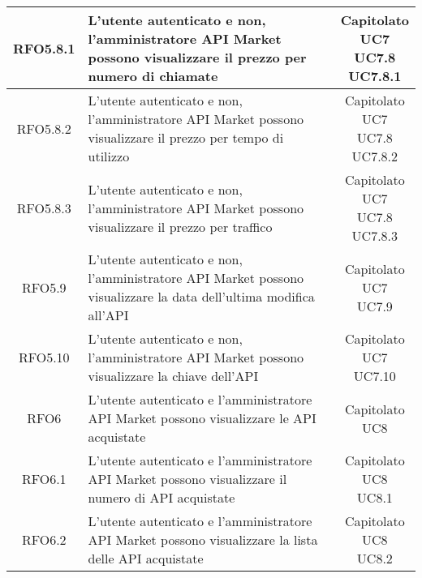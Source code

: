 \begin{longtable}{|c|p{8cm}|c|}
\hypertarget{RFO5.8.1}{RFO5.8.1} &  L'utente autenticato e non, l'amministratore API Market possono visualizzare il prezzo per numero di chiamate & \makecell*{Capitolato\\UC7\\UC7.8\\UC7.8.1} \\
\hline

\hypertarget{RFO5.8.2}{RFO5.8.2} &  L'utente autenticato e non, l'amministratore API Market possono visualizzare il prezzo per tempo di utilizzo & \makecell*{Capitolato\\UC7\\UC7.8\\UC7.8.2} \\
\hline

\hypertarget{RFO5.8.3}{RFO5.8.3} &  L'utente autenticato e non, l'amministratore API Market possono visualizzare il prezzo per traffico & \makecell*{Capitolato\\UC7\\UC7.8\\UC7.8.3} \\
\hline

\hypertarget{RFO5.9}{RFO5.9} & L'utente autenticato e non, l'amministratore API Market possono visualizzare la data dell'ultima modifica all'API& \makecell*{Capitolato\\UC7\\UC7.9} \\
\hline

\hypertarget{RFO5.10}{RFO5.10} & L'utente autenticato e non, l'amministratore API Market possono visualizzare la chiave dell'API& \makecell*{Capitolato\\UC7\\UC7.10} \\
\hline

\hypertarget{RFO6}{RFO6} & L'utente autenticato e l'amministratore API Market possono visualizzare le API acquistate & \makecell*{Capitolato\\UC8} \\
\hline

\hypertarget{RFO6.1}{RFO6.1} & L'utente autenticato e l'amministratore API Market possono visualizzare il numero di API acquistate& \makecell*{Capitolato\\UC8\\UC8.1} \\
\hline

\hypertarget{RFO6.2}{RFO6.2} & L'utente autenticato e l'amministratore API Market possono visualizzare la lista delle API acquistate& \makecell*{Capitolato\\UC8\\UC8.2} \\
\hline


\end{longtable}
